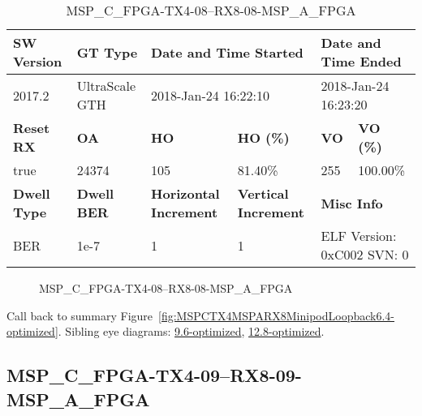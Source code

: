 \begin{table}[h]
\centering
\caption{MSP\_C\_FPGA-TX4-08--RX8-08-MSP\_A\_FPGA}
\label{tab:MSPCFPGATX408RX808MSPAFPGA6.4-optimized}
\begin{tabular}{@{}|l|l|l|l|l|l|@{}}
\toprule
\textbf{SW Version}                & \textbf{GT Type}   & \multicolumn{2}{l|}{\textbf{Date and Time Started}}            & \multicolumn{2}{l|}{\textbf{Date and Time Ended}}        \\ \midrule
2017.2                       & UltraScale GTH          & \multicolumn{2}{l|}{2018-Jan-24 16:22:10}                   & \multicolumn{2}{l|}{2018-Jan-24 16:23:20}               \\ \midrule
\textbf{Reset RX}                  & \textbf{OA} & \textbf{HO}   & \textbf{HO (\%)} & \textbf{VO} & \textbf{VO (\%)} \\ \midrule
true & 24374        & 105          & 81.40\%        & 255        & 100.00\%       \\ \midrule
\textbf{Dwell Type}                & \textbf{Dwell BER} & \textbf{Horizontal Increment} & \textbf{Vertical Increment}    & \multicolumn{2}{l|}{\textbf{Misc Info}}                  \\ \midrule
BER                            & 1e-7        & 1        & 1           & \multicolumn{2}{l|}{ELF Version: 0xC002 SVN: 0}                         \\ \bottomrule
\end{tabular}
\end{table}

\begin{figure}[h]
\caption{MSP\_C\_FPGA-TX4-08--RX8-08-MSP\_A\_FPGA} \label{fig:MSPCFPGATX408RX808MSPAFPGA6.4-optimized}
\end{figure}

Call back to summary Figure~\ref{fig:MSPCTX4MSPARX8MinipodLoopback6.4-optimized}.
Sibling eye diagrams: \hyperref[sec:MSPCFPGATX408RX808MSPAFPGA9.6-optimized]{9.6-optimized}, \hyperref[sec:MSPCFPGATX408RX808MSPAFPGA12.8-optimized]{12.8-optimized}.

\clearpage
\newpage


\subsection{MSP\_C\_FPGA-TX4-09--RX8-09-MSP\_A\_FPGA}\label{sec:MSPCFPGATX409RX809MSPAFPGA6.4-optimized}

